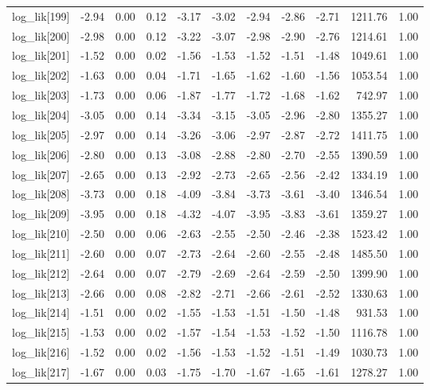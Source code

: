 \begin{table}[ht]
\begin{tabular}{rrrrrrrrrrr}
  log\_lik[199] & -2.94 & 0.00 & 0.12 & -3.17 & -3.02 & -2.94 & -2.86 & -2.71 & 1211.76 & 1.00 \\ 
  log\_lik[200] & -2.98 & 0.00 & 0.12 & -3.22 & -3.07 & -2.98 & -2.90 & -2.76 & 1214.61 & 1.00 \\ 
  log\_lik[201] & -1.52 & 0.00 & 0.02 & -1.56 & -1.53 & -1.52 & -1.51 & -1.48 & 1049.61 & 1.00 \\ 
  log\_lik[202] & -1.63 & 0.00 & 0.04 & -1.71 & -1.65 & -1.62 & -1.60 & -1.56 & 1053.54 & 1.00 \\ 
  log\_lik[203] & -1.73 & 0.00 & 0.06 & -1.87 & -1.77 & -1.72 & -1.68 & -1.62 & 742.97 & 1.00 \\ 
  log\_lik[204] & -3.05 & 0.00 & 0.14 & -3.34 & -3.15 & -3.05 & -2.96 & -2.80 & 1355.27 & 1.00 \\ 
  log\_lik[205] & -2.97 & 0.00 & 0.14 & -3.26 & -3.06 & -2.97 & -2.87 & -2.72 & 1411.75 & 1.00 \\ 
  log\_lik[206] & -2.80 & 0.00 & 0.13 & -3.08 & -2.88 & -2.80 & -2.70 & -2.55 & 1390.59 & 1.00 \\ 
  log\_lik[207] & -2.65 & 0.00 & 0.13 & -2.92 & -2.73 & -2.65 & -2.56 & -2.42 & 1334.19 & 1.00 \\ 
  log\_lik[208] & -3.73 & 0.00 & 0.18 & -4.09 & -3.84 & -3.73 & -3.61 & -3.40 & 1346.54 & 1.00 \\ 
  log\_lik[209] & -3.95 & 0.00 & 0.18 & -4.32 & -4.07 & -3.95 & -3.83 & -3.61 & 1359.27 & 1.00 \\ 
  log\_lik[210] & -2.50 & 0.00 & 0.06 & -2.63 & -2.55 & -2.50 & -2.46 & -2.38 & 1523.42 & 1.00 \\ 
  log\_lik[211] & -2.60 & 0.00 & 0.07 & -2.73 & -2.64 & -2.60 & -2.55 & -2.48 & 1485.50 & 1.00 \\ 
  log\_lik[212] & -2.64 & 0.00 & 0.07 & -2.79 & -2.69 & -2.64 & -2.59 & -2.50 & 1399.90 & 1.00 \\ 
  log\_lik[213] & -2.66 & 0.00 & 0.08 & -2.82 & -2.71 & -2.66 & -2.61 & -2.52 & 1330.63 & 1.00 \\ 
  log\_lik[214] & -1.51 & 0.00 & 0.02 & -1.55 & -1.53 & -1.51 & -1.50 & -1.48 & 931.53 & 1.00 \\ 
  log\_lik[215] & -1.53 & 0.00 & 0.02 & -1.57 & -1.54 & -1.53 & -1.52 & -1.50 & 1116.78 & 1.00 \\ 
  log\_lik[216] & -1.52 & 0.00 & 0.02 & -1.56 & -1.53 & -1.52 & -1.51 & -1.49 & 1030.73 & 1.00 \\ 
  log\_lik[217] & -1.67 & 0.00 & 0.03 & -1.75 & -1.70 & -1.67 & -1.65 & -1.61 & 1278.27 & 1.00 \\ 

\end{tabular}
\end{table}
